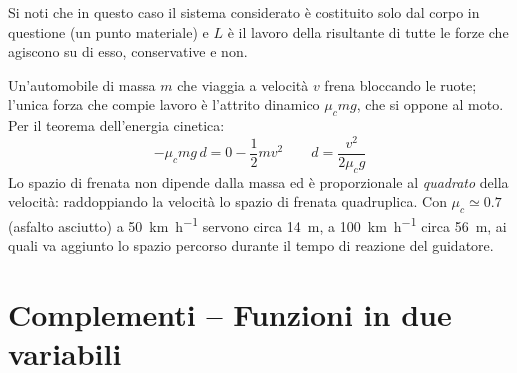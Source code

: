 Si noti che in questo caso il sistema considerato è costituito solo dal corpo in questione (un punto materiale) e $L$ è il lavoro della risultante di tutte le forze che agiscono su di esso, conservative e non.

\begin{Es}
  Un'automobile di massa $m$ che viaggia a velocità $v$ frena bloccando le ruote; l'unica forza che compie lavoro è l'attrito dinamico $\mu_c mg$, che si oppone al moto. Per il teorema dell'energia cinetica:
  \[
    -\mu_c mg\,d=0-\frac{1}{2}mv^2\qquad d=\frac{v^2}{2\mu_cg}
  \]
  Lo spazio di frenata non dipende dalla massa ed è proporzionale al \emph{quadrato} della velocità: raddoppiando la velocità lo spazio di frenata quadruplica. Con $\mu_c\simeq0.7$ (asfalto asciutto) a \SI{50}{\kilo\meter\per\hour} servono circa \SI{14}{\meter}, a \SI{100}{\kilo\meter\per\hour} circa \SI{56}{\meter}, ai quali va aggiunto lo spazio percorso durante il tempo di reazione del guidatore.
\end{Es}
\section{Complementi -- Funzioni in due variabili}

